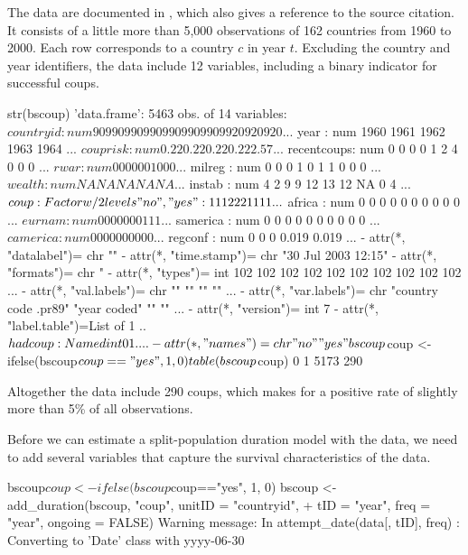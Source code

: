 The data are documented in , which also gives a reference to the source citation. It consists of a little more than 5,000 observations of 162 countries from 1960 to 2000. Each row corresponds to a country $c$ in year $t$. Excluding the country and year identifiers, the data include 12 variables, including a binary indicator for successful coups. 

\begin{example}
  str(bscoup)
  'data.frame':	5463 obs. of  14 variables:
  $ countryid  : num  909 909 909 909 909 909 909 920 920 920 ...
  $ year       : num  1960 1961 1962 1963 1964 ...
  $ couprisk   : num  0.22 0.22 0.22 0.22 2.57 ...
  $ recentcoups: num  0 0 0 0 1 2 4 0 0 0 ...
  $ rwar       : num  0 0 0 0 0 0 1 0 0 0 ...
  $ milreg     : num  0 0 0 1 0 1 1 0 0 0 ...
  $ wealth     : num  NA NA NA NA NA ...
  $ instab     : num  4 2 9 9 12 13 12 NA 0 4 ...
  $ coup       : Factor w/ 2 levels "no","yes": 1 1 1 2 2 2 1 1 1 1 ...
  $ africa     : num  0 0 0 0 0 0 0 0 0 0 ...
  $ eurnam     : num  0 0 0 0 0 0 0 1 1 1 ...
  $ samerica   : num  0 0 0 0 0 0 0 0 0 0 ...
  $ camerica   : num  0 0 0 0 0 0 0 0 0 0 ...
  $ regconf    : num  0 0 0 0.019 0.019 ...
  - attr(*, "datalabel")= chr ""
  - attr(*, "time.stamp")= chr "30 Jul 2003 12:15"
  - attr(*, "formats")= chr  "%
  - attr(*, "types")= int  102 102 102 102 102 102 102 102 102 102 ...
  - attr(*, "val.labels")= chr  "" "" "" "" ...
  - attr(*, "var.labels")= chr  "country code .pr89" "year coded" "" "" ...
  - attr(*, "version")= int 7
  - attr(*, "label.table")=List of 1
  ..$ hadcoup: Named int  0 1
  .. ..- attr(*, "names")= chr  "no" "yes"
  bscoup$coup <- ifelse(bscoup$coup == "yes", 1, 0)
  table(bscoup$coup)
  0    1
  5173  290 
\end{example}

Altogether the data include 290 coups, which makes for a positive rate of slightly more than 5\% of all observations. 

Before we can estimate a split-population duration model with the data, we need to add several variables that capture the survival characteristics of the data.

\begin{example}
  bscoup$coup <- ifelse(bscoup$coup=="yes", 1, 0)
  bscoup <- add_duration(bscoup, "coup", unitID = "countryid", 
  +    tID = "year", freq = "year", ongoing = FALSE)
  Warning message:
  In attempt_date(data[, tID], freq) :
  Converting to 'Date' class with yyyy-06-30
\end{example}

